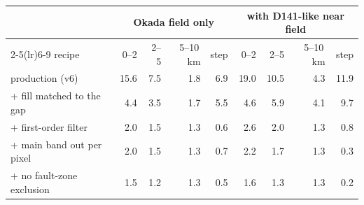 \begin{tabular}{lrrrrrrrr}
\toprule
 & \multicolumn{4}{c}{Okada field only} & \multicolumn{4}{c}{with D141-like near field} \\
\cmidrule(lr){2-5}\cmidrule(lr){6-9}
recipe & 0--2 & 2--5 & 5--10\,km & step & 0--2 & 2--5 & 5--10\,km & step \\
\midrule
production (v6) & 15.6 & 7.5 & 1.8 & 6.9 & 19.0 & 10.5 & 4.3 & 11.9 \\
+ fill matched to the gap & 4.4 & 3.5 & 1.7 & 5.5 & 4.6 & 5.9 & 4.1 & 9.7 \\
+ first-order filter & 2.0 & 1.5 & 1.3 & 0.6 & 2.6 & 2.0 & 1.3 & 0.8 \\
+ main band out per pixel & 2.0 & 1.5 & 1.3 & 0.7 & 2.2 & 1.7 & 1.3 & 0.3 \\
+ no fault-zone exclusion & 1.5 & 1.2 & 1.3 & 0.5 & 1.6 & 1.3 & 1.3 & 0.2 \\
\bottomrule
\end{tabular}

